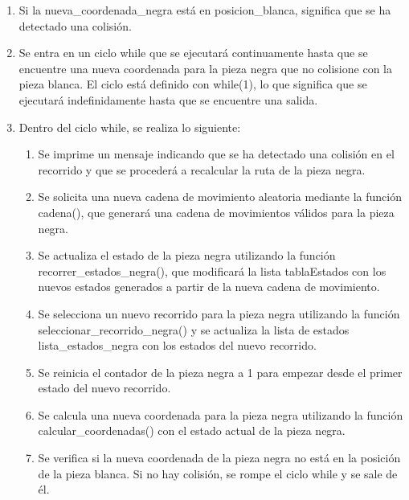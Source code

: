 \begin{enumerate}
\begin{enumerate}
    \item Si la nueva\_coordenada\_negra está en posicion\_blanca, significa que se ha detectado una colisión.\newline
    
    \item Se entra en un ciclo while que se ejecutará continuamente hasta que se encuentre una nueva coordenada para la pieza negra que no colisione con la pieza blanca. El ciclo está definido con while(1), lo que significa que se ejecutará indefinidamente hasta que se encuentre una salida.\newline
    
    \item Dentro del ciclo while, se realiza lo siguiente:\newline
        \begin{enumerate}
            \item Se imprime un mensaje indicando que se ha detectado una colisión en el recorrido y que se procederá a recalcular la ruta de la pieza negra.\newline
            \item Se solicita una nueva cadena de movimiento aleatoria mediante la función cadena(), que generará una cadena de movimientos válidos para la pieza negra.\newline
            \item Se actualiza el estado de la pieza negra utilizando la función recorrer\_estados\_negra(), que modificará la lista tablaEstados con los nuevos estados generados a partir de la nueva cadena de movimiento.\newline
            \item Se selecciona un nuevo recorrido para la pieza negra utilizando la función seleccionar\_recorrido\_negra() y se actualiza la lista de estados lista\_estados\_negra con los estados del nuevo recorrido.\newline
            \item Se reinicia el contador de la pieza negra a 1 para empezar desde el primer estado del nuevo recorrido.\newline
            \item Se calcula una nueva coordenada para la pieza negra utilizando la función calcular\_coordenadas() con el estado actual de la pieza negra.\newline
            \item Se verifica si la nueva coordenada de la pieza negra no está en la posición de la pieza blanca. Si no hay colisión, se rompe el ciclo while y se sale de él.\newline
            

\end{enumerate}
\end{enumerate}
\end{enumerate}
